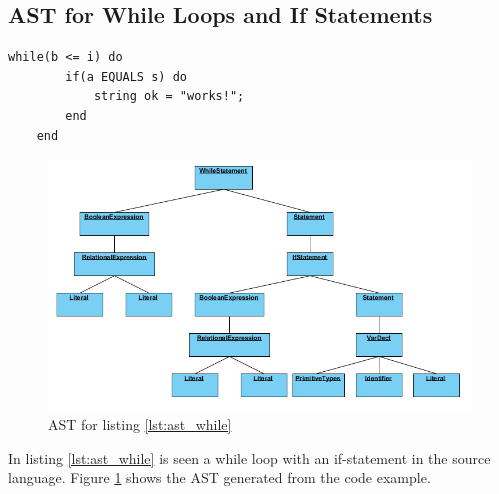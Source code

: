 \subsection{AST for While Loops and If Statements}
\begin{lstlisting}[caption=While loop with if-statement, label=lst:ast_while]
	while(b <= i) do
		if(a EQUALS s) do
			string ok = "works!";
		end
	end
\end{lstlisting}
\begin{figure}[H]
	\centering
		\includegraphics[width=\textwidth]{billeder/while_AST.png}
		\caption{AST for listing \ref{lst:ast_while}}
		\label{fig:ast_while}
\end{figure}
In listing \ref{lst:ast_while} is seen a while loop with an if-statement in the source language. Figure \ref{fig:ast_while} shows the AST generated from the code example.